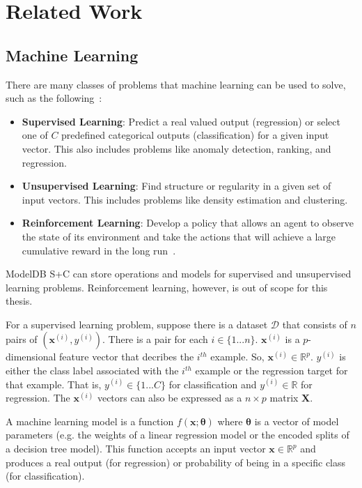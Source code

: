\chapter{Related Work}

\section{Machine Learning}
There are many classes of problems that machine learning can be used to solve, such
as the following~\cite{introtoml}:

\begin{itemize}
  \item \textbf{Supervised Learning}: Predict a real valued output (regression)
    or select one of $C$ predefined categorical outputs (classification)
    for a given input vector. This also includes problems like anomaly detection,
    ranking, and regression.
  \item \textbf{Unsupervised Learning}: Find structure or regularity in a given
    set of input vectors. This includes problems like density estimation and 
    clustering.
  \item \textbf{Reinforcement Learning}: Develop a policy that allows an agent
    to observe the state of its environment and take the actions that will 
    achieve a large cumulative reward in the long run~\cite{introtorl}.
\end{itemize}

ModelDB S+C can store operations and models for supervised
and unsupervised learning problems. Reinforcement learning, however, is out
of scope for this thesis.

For a supervised learning problem, suppose there is a dataset $\mathcal{D}$ that
consists of $n$ pairs of $(\textbf{x}^{(i)}, y^{(i)})$. There is a
pair for each $i \in \{{1...n}\}$. $\textbf{x}^{(i)}$ is a $p$-dimensional feature
vector that decribes the $i^{th}$ example. So, $\textbf{x}^{(i)} \in \mathbb{R}^{p}$. 
$y^{(i)}$ is either the class label associated with the $i^{th}$ example or
the regression target for that example. That is, $y^{(i)} \in \{1...C\}$ for classification
and $y^{(i)} \in \mathbb{R}$ for regression. The $\textbf{x}^{(i)}$ vectors
can also be expressed as a $n \times p$ matrix $\textbf{X}$.

A machine learning model is a function $f(\textbf{x}; \boldsymbol{\theta})$ where
$\boldsymbol{\theta}$ is a vector of model parameters (e.g. the weights of a linear regression
model or the encoded splits of a decision tree model). This function accepts an 
input vector $\textbf{x} \in \mathbb{R}^{p}$ and produces a real output (for regression)
or probability of being in a specific class (for classification).

